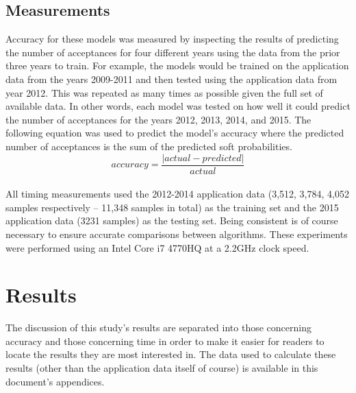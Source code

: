 \documentclass[titlepage]{article}
\newcommand{\abs}[1]{\lvert #1 \rvert}
\begin{document}
\subsection{Measurements}
Accuracy for these models was measured by inspecting the results of predicting the number of acceptances for four different years using the data from the prior three years to train. For example, the models would be trained on the application data from the years 2009-2011 and then tested using the application data from year 2012. This was repeated as many times as possible given the full set of available data. In other words, each model was tested on how well it could predict the number of acceptances for the years 2012, 2013, 2014, and 2015. The following equation was used to predict the model's accuracy where the predicted number of acceptances is the sum of the predicted soft probabilities.\\
$$accuracy = \frac{\abs{actual-predicted}}{actual}$$\\
All timing measurements used the 2012-2014 application data (3,512, 3,784, 4,052 samples respectively -- 11,348 samples in total) as the training set and the 2015 application data (3231 samples) as the testing set. Being consistent is of course necessary to ensure accurate comparisons between algorithms. These experiments were performed using an Intel Core i7 4770HQ at a 2.2GHz clock speed.



\newpage
\section{Results}
The discussion of this study's results are separated into those concerning accuracy and those concerning time in order to make it easier for readers to locate the results they are most interested in. The data used to calculate these results (other than the application data itself of course) is available in this document's appendices.
\end{document}

